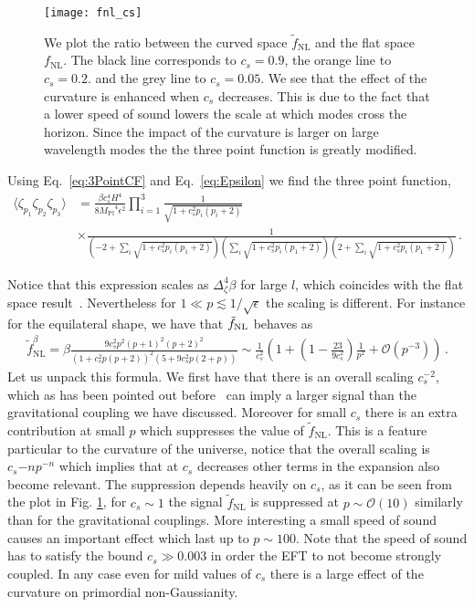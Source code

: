 \documentclass[a4paper,11pt]{article}
\numberwithin{equation}{section}
\newcommand{\mpl}{{M_{\mathrm{Pl}}}}
\numberwithin{equation}{section}
\begin{document}
\begin{figure}[h!]
  \texttt{[image: fnl\_cs]}
\caption{We plot the ratio between the curved space $\tilde {f}_{\mathrm{NL}}$ and the flat space $ f_{\mathrm{NL}}$. The black line corresponds to $c_s=0.9$, the orange line to $c_s=0.2$. and the grey line to $c_s=0.05$. We see that the effect of the curvature is enhanced when $c_s$ decreases. This is due to the fact that a lower speed of sound lowers the scale at which modes cross the horizon. Since the impact of the curvature is larger on large wavelength modes the the three point function is greatly modified.   \\}
\label{Fig:fnl_cs}
\end{figure}
Using Eq.~\eqref{eq:3PointCF} and Eq.~\eqref{eq:Epsilon} we find the three point function,
\begin{align}
\langle\zeta_{p_1}\zeta_{p_2}\zeta_{p_3}\rangle&=\frac{\beta c_s^4 H^4}{8 \mpl^4\epsilon^2}\prod_{i=1}^3\frac{1}{\sqrt{1+c_s^2 p_i(p_i+2)}}\\
&\times\frac{1}{(-2+\sum_i\sqrt{1+c_s^2 p_i(p_1+2)})(\sum_i\sqrt{1+c_s^2 p_i(p_1+2)})(2+\sum_i\sqrt{1+c_s^2 p_i(p_1+2)})} \,. \nonumber
\end{align}

Notice that this expression scales as $\Delta_\zeta^4\beta$ for large $l$, which coincides with the flat space result~\cite{Senatore:2009gt}. Nevertheless for $1\ll p\lesssim 1/\sqrt{\epsilon}$ the scaling is different. For instance for the equilateral shape, we have that $\tilde f_{\rm NL}$ behaves as
\begin{align}
\tilde{f}^{\beta}_{\mathrm{NL}}=\beta\frac{9c_s^2 p^2(p+1)^2(p+2)^2}{(1+c_s^2 p(p+2))^2(5+9 c_s^2 p(2+p))}\sim \frac{1}{c_s^2}\left(1+\left(1-\frac{23}{9c_s^2}\right)\frac{1}{p^2}+\mathcal{O}(p^{-3})\right) \,.
\end{align}
Let us unpack this formula. We first have that there is an  overall scaling $c_s^{-2}$, which as has been pointed out before~\cite{Chen:2006nt,Cheung:2007st} can imply a larger signal than the gravitational coupling we have discussed. Moreover for small $c_s$ there is an extra contribution at small $p$ which suppresses the value of $\tilde{f}_{\mathrm{NL}}$.  This is a feature particular to the  curvature of the universe,  notice that the overall scaling is $c_s{-n}p^{-n}$  which implies that  at $c_s$ decreases other terms in the expansion also become relevant. The suppression depends heavily on $c_s$, as it can be seen from the plot in  Fig. \ref{Fig:fnl_cs}, for $c_s\sim 1$ the signal $\tilde{f}_{\mathrm{NL}}$ is  suppressed at $p \sim \mathcal{O}(10)$ similarly than for the gravitational couplings. More interesting a small speed of sound causes an important effect which last up to $p\sim 100$.  Note that the speed of sound has to satisfy the bound $c_s\gg 0.003$ in order the EFT to not become strongly coupled. In any case even for mild values of $c_s$ there is a large effect of the curvature on primordial non-Gaussianity.
\end{document}
